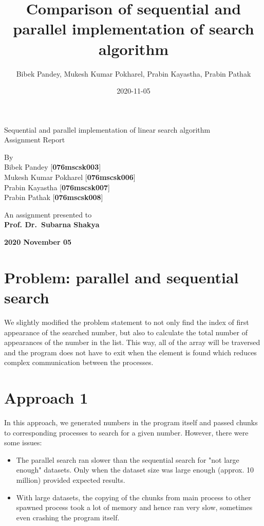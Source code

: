 \documentclass[12pt]{article}
\title{Comparison of sequential and parallel implementation of search algorithm}
\date{2020-11-05}
\author{Bibek Pandey, Mukesh Kumar Pokharel, Prabin Kayastha, Prabin Pathak}
\begin{document}
\begin{titlepage}
   \begin{center}
       \vspace*{1cm}

       {\huge Sequential and parallel implementation of linear search algorithm} \\
       \vspace{0.5cm}
       Assignment Report

       \vfill

       By \\
       \vspace{0.5cm}
       Bibek Pandey [\textbf{076mscsk003}]\\
       Mukesh Kumar Pokharel [\textbf{076mscsk006}]\\
       Prabin Kayastha [\textbf{076mscsk007}]\\
       Prabin Pathak [\textbf{076mscsk008}]
       \vspace{1.5cm}

       \vfill

       An assignment presented to \\
       \vspace{0.3cm}
       \textbf{Prof. Dr.\ Subarna Shakya}

       \vspace{1.5cm}
       \textbf{2020 November 05}

   \end{center}
\end{titlepage}

\section*{Problem: parallel and sequential search}
We slightly modified the problem statement to not only find the index of first appearance of the searched number, but also to calculate the total number of appearances 
of the number in the list. This way, all of the array will be traversed and the program does not have to exit when the element is found which reduces complex
communication between the processes.

\section*{Approach 1}
In this approach, we generated numbers in the program itself and passed chunks to corresponding processes to search for a given number. However, there were some issues:
\begin{itemize}
    \item The parallel search ran slower than the sequential search for "not large enough" datasets. Only when the dataset size was large enough (approx. 10 million)  provided expected results.
    \item With large datasets, the copying of the chunks from main process to other spawned process took a lot of memory and hence ran very slow, sometimes even crashing the program itself.
\end{itemize}
\end{document}
